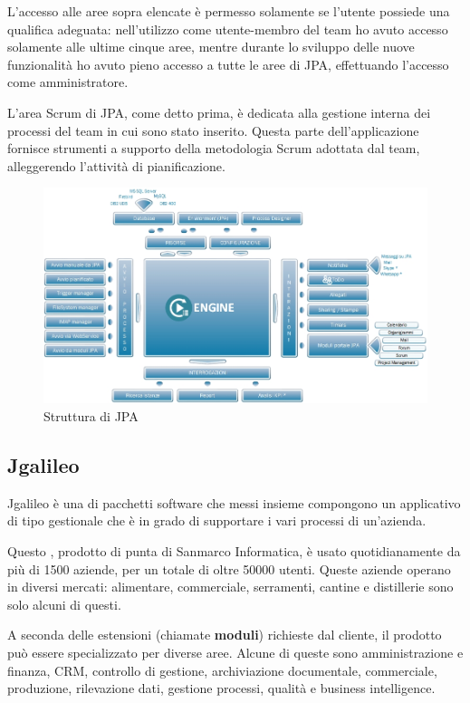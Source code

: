 L'accesso alle aree sopra elencate è permesso solamente se l'utente possiede
una qualifica adeguata: nell'utilizzo come utente-membro del team ho
avuto accesso solamente alle ultime cinque aree, mentre durante lo sviluppo
delle nuove funzionalità ho avuto pieno accesso a tutte le aree di JPA,
effettuando l'accesso come amministratore.

L'area Scrum di JPA, come detto prima, è dedicata alla gestione interna dei
processi del team in cui sono stato inserito. Questa parte dell'applicazione
fornisce strumenti a supporto della metodologia Scrum adottata dal team,
alleggerendo l'attività di pianificazione.

\begin{figure}[H]%
\centering
\includegraphics[width=.8\columnwidth]{immagini/jpa-strutt}%
\caption{Struttura di JPA}%
\label{fig:strutt-jpa}%
\end{figure}
\subsection{Jgalileo}
Jgalileo è una  di pacchetti software che messi insieme compongono
un applicativo di tipo gestionale che è in grado di supportare i vari processi
di un'azienda.

Questo , prodotto di punta di Sanmarco Informatica, è usato
quotidianamente da più di 1500 aziende, per un totale di oltre 50000 utenti.
Queste aziende operano in diversi mercati: alimentare, commerciale, serramenti,
cantine e distillerie sono solo alcuni di questi.

A seconda delle estensioni (chiamate \textbf{moduli}) richieste dal cliente,
il prodotto può essere specializzato per diverse aree. Alcune di queste sono
amministrazione e finanza, CRM, controllo di gestione, archiviazione
documentale, commerciale, produzione, rilevazione dati, gestione processi,
qualità e business intelligence.

